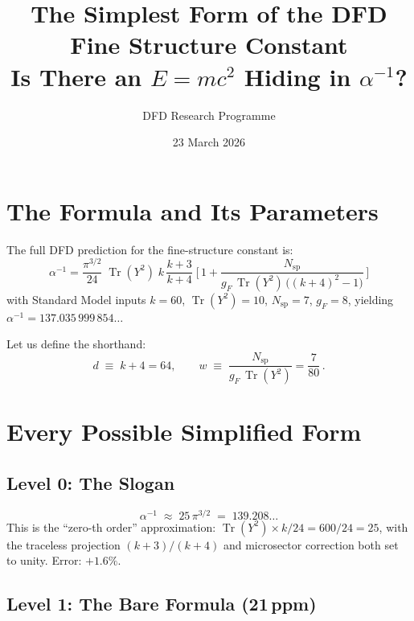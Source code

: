\documentclass[11pt]{article}
\title{\textbf{The Simplest Form of the DFD Fine Structure Constant}\\[4pt]
\large Is There an $E = mc^2$ Hiding in $\alpha^{-1}$?}
\author{DFD Research Programme}
\date{23 March 2026}
\newcommand{\Tr}{\operatorname{Tr}}
\begin{document}
\maketitle

\section{The Formula and Its Parameters}

The full DFD prediction for the fine-structure constant is:
\begin{equation}
\boxed{\;
\alpha^{-1}
= \frac{\pi^{3/2}}{24}\;\Tr(Y^2)\;
k\,\frac{k+3}{k+4}\;
\biggl[\,1 + \frac{N_{\mathrm{sp}}}{g_F\,\Tr(Y^2)\,\bigl((k{+}4)^2 - 1\bigr)}\,\biggr]
\;}
\label{eq:master}
\end{equation}
with Standard Model inputs $k = 60$, $\Tr(Y^2) = 10$, $N_{\mathrm{sp}} = 7$,
$g_F = 8$, yielding $\alpha^{-1} = 137.035\,999\,854\ldots$

Let us define the shorthand:
\[
d \;\equiv\; k + 4 = 64, \qquad
w \;\equiv\; \frac{N_{\mathrm{sp}}}{g_F\,\Tr(Y^2)} = \frac{7}{80}\,.
\]


\section{Every Possible Simplified Form}
\label{sec:all-forms}

\subsection{Level 0: The Slogan}

\begin{equation}
\alpha^{-1} \;\approx\; 25\,\pi^{3/2} \;=\; 139.208\ldots
\label{eq:slogan}
\end{equation}
This is the ``zero-th order'' approximation: $\Tr(Y^2) \times k / 24 = 600/24 = 25$,
with the traceless projection $(k{+}3)/(k{+}4)$ and microsector correction both
set to unity.  Error: $+1.6\%$.

\subsection{Level 1: The Bare Formula (21\,ppm)}
\end{document}
